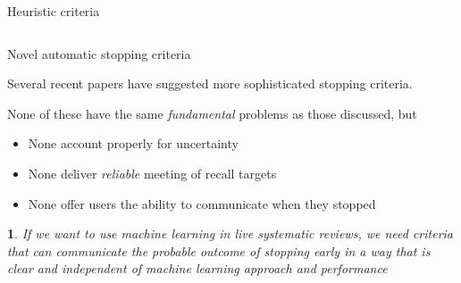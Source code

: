 \documentclass[9pt, aspectratio=169]{beamer}
\newtheorem*{remark}{}
\begin{document}
\begin{frame}{Heuristic criteria}
\begin{columns}
\begin{column}{0.382\linewidth}
	\end{column}
\end{columns}
\end{frame}

\begin{frame}{Novel automatic stopping criteria}

Several recent papers \cite{Yu2019, DiNunzio2018, Howard2020} have suggested more sophisticated stopping criteria.

\medskip

None of these have the same \textit{fundamental} problems as those discussed, but

\begin{itemize}
	\item None account properly for uncertainty
	\item None deliver \textit{reliable} meeting of recall targets
	\item None offer users the ability to communicate when they stopped
\end{itemize}

\begin{remark}
	If we want to use machine learning in live systematic reviews, we need criteria that can communicate the probable outcome of stopping early in a way that is clear and independent of machine learning approach and performance
\end{remark}

\end{frame}
\end{document}
